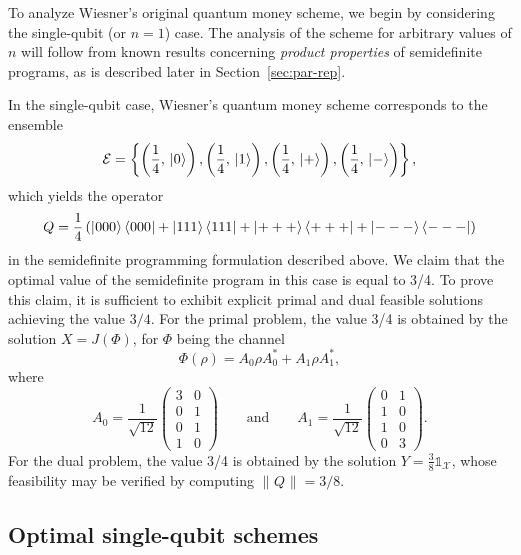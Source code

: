 \documentclass[11pt,letterpaper]{article}
\theoremstyle{definition}
\newcommand{\tinyspace}{\mspace{1mu}}
\newcommand{\microspace}{\mspace{0.5mu}}
\newcommand{\norm}[1]{\left\lVert\tinyspace#1\tinyspace\right\rVert}
\def\I{\mathbb{1}}
\def \lket {\left|}
\def \rket {\right\rangle}
\def \lbra {\left\langle}
\def \rbra {\right|}
\newcommand{\ket}[1]{\lket\microspace #1 \microspace\rket}
\newcommand{\bra}[1]{\lbra\microspace #1 \microspace\rbra}
\def\X{\mathcal{X}}
\def\E{\mathcal{E}}
\begin{document}
To analyze Wiesner's original quantum money scheme, we begin by
considering the single-qubit (or $n=1$) case.
The analysis of the scheme for arbitrary values of $n$ will follow
from known results concerning \emph{product properties} of
semidefinite programs, as is described later in
Section~\ref{sec:par-rep}.

In the single-qubit case, Wiesner's quantum money scheme corresponds
to the ensemble
\[
\E = 
\left\{
\left(\frac{1}{4}, \, \ket{0}\right),
\left(\frac{1}{4}, \, \ket{1}\right),
\left(\frac{1}{4}, \, \ket{+}\right),
\left(\frac{1}{4}, \, \ket{-}\right)
\right\},
\]
which yields the operator 
\[
Q =  
\frac{1}{4} \left( \ket{000} \bra{000} + \ket{111}\bra{111} +  
\ket{+++} \bra{+++}  + \ket{---} \bra{---}   \right)
\]
in the semidefinite programming formulation described above.
We claim that the optimal value of the semidefinite program in this
case is equal to 3/4.
To prove this claim, it is sufficient to exhibit explicit primal and
dual feasible solutions achieving the value $3/4$.
For the primal problem, the value 3/4 is obtained by the solution
$X = J(\Phi)$, for $\Phi$ being the channel
\[
\Phi(\rho) = A_0 \rho A_0^{\ast} + A_1 \rho A_1^{\ast},
\]
where
\[
A_0 = \frac{1}{\sqrt{12}}
\begin{pmatrix} 3 & 0 \\ 0 & 1 \\  0 & 1 \\ 1 & 0 \end{pmatrix}
\qquad\text{and}\qquad
A_1 =  \frac{1}{\sqrt{12}}
\begin{pmatrix} 0 & 1 \\ 1 & 0 \\  1 & 0 \\ 0 & 3 \end{pmatrix}.
\]
For the dual problem, the value 3/4 is obtained by the solution
$Y = \frac{3}{8}\I_{\X}$, whose feasibility may be verified by computing
$\norm{Q} = 3/8$.

\subsection{Optimal single-qubit schemes}
\end{document}
